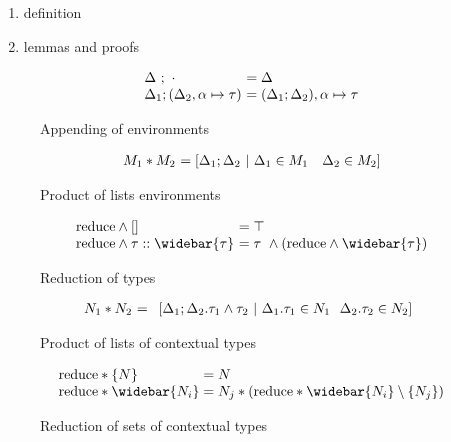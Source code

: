 \documentclass[manuscript]{acmart}
\begin{document}
\begin{enumerate}
  \item definition 
  \item lemmas and proofs 
\end{enumerate}

\begin{figure*}[h]
  \[
    \begin{array}{l @{} l}
    \Delta\ ;\ \cdot
    &\ = \Delta 
    \\
    \Delta_1;(\Delta_2,\alpha \mapsto \tau) 
    &\ = (\Delta_1;\Delta_2),\alpha \mapsto \tau
    \end{array}
  \]

  \caption{Appending of environments}
\end{figure*}

\begin{figure*}[h]
  \[
    \begin{array}{l @{} l}
    M_1 * M_2 
    &\ = 
    [\Delta_1 ; \Delta_2 \ |\ 
      \Delta_1 \in M_1
      \ \ \  
      \Delta_2 \in M_2
    ]
    \end{array}
  \]

  \caption{Product of lists environments}
\end{figure*}

\begin{figure*}[h]
  \[
    \begin{array}{l @{} l}
    \text{reduce} \wedge [] 
    &\ = \top
    \\
    \text{reduce} \wedge \tau::\widebar{\tau}
    &\ = \tau\ \wedge (\text{reduce} \wedge \widebar{\tau})
    \end{array}
  \]

  \caption{Reduction of types}
\end{figure*}

\begin{figure*}[h]
  \[
    \begin{array}{l @{} l}
      N_1 * N_2
      &\ = 
      \begin{array}[t]{l}
        [ \Delta_1 ; \Delta_2 . \tau_1 \wedge \tau_2 \ |\ 
          \Delta_1.\tau_1 \in N_1
          \ \ 
          \Delta_2.\tau_2 \in N_2
        ]
      \end{array}
    \end{array}
  \]

  \caption{Product of lists of contextual types}
\end{figure*}

\begin{figure*}[h]
  \[
    \begin{array}{l @{}l}
    \text{reduce} * \{N\}
    & {}= N
    \\
    \text{reduce} * \widebar{N_i}
    & {}= N_j * (\text{reduce} * \widebar{N_i}\setminus\{N_j\})
    \end{array}
  \]

  \caption{Reduction of sets of contextual types}
\end{figure*}
\end{document}
